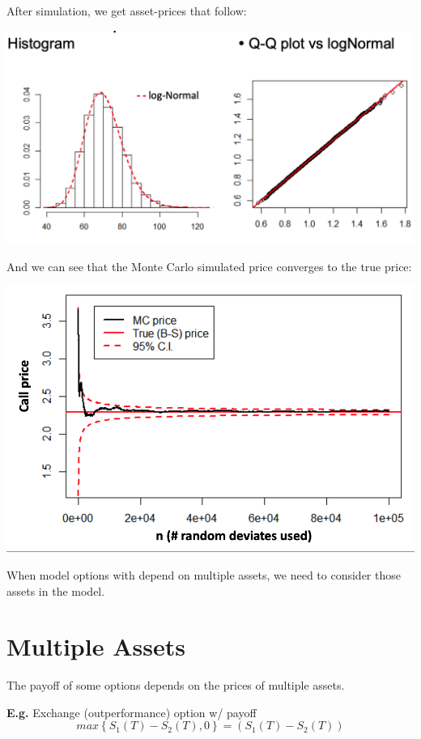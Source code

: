 \documentclass[
  oneside]{book}
\begin{document}
After simulation, we get asset-prices that follow:

\includegraphics{Notes/Obsidian-Attachments/10-Monte-Carlo-2.png}

And we can see that the Monte Carlo simulated price converges to the true price:

\includegraphics{Notes/Obsidian-Attachments/10-Monte-Carlo-3.png}

When model options with depend on multiple assets, we need to consider those assets in the model.

\hypertarget{multiple-assets}{%
\section{Multiple Assets}\label{multiple-assets}}

The payoff of some options depends on the prices of multiple assets.

\textbf{E.g.} Exchange (outperformance) option w/ payoff
\[
max \left\{ S_{1}(T) - S_{2}(T), 0 \right\} = (S_{1}(T)-S_{2}(T))
\]
\end{document}
